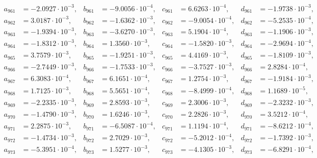 \begin{align*}
  a_{ 961 } &= -2.0927 \cdot 10^{ -3 }, & b_{ 961 } &= -9.0056 \cdot 10^{ -4 }, & c_{ 961 } &= 6.6263 \cdot 10^{ -4 }, & d_{ 961 } &= -1.9738 \cdot 10^{ -3 }, \\ 
  a_{ 962 } &= 3.0187 \cdot 10^{ -3 }, & b_{ 962 } &= -1.6362 \cdot 10^{ -3 }, & c_{ 962 } &= -9.0054 \cdot 10^{ -4 }, & d_{ 962 } &= -5.2535 \cdot 10^{ -4 }, \\ 
  a_{ 963 } &= -1.9394 \cdot 10^{ -3 }, & b_{ 963 } &= -3.6270 \cdot 10^{ -3 }, & c_{ 963 } &= 5.1904 \cdot 10^{ -4 }, & d_{ 963 } &= -1.1906 \cdot 10^{ -3 }, \\ 
  a_{ 964 } &= -1.8312 \cdot 10^{ -3 }, & b_{ 964 } &= 1.3560 \cdot 10^{ -3 }, & c_{ 964 } &= -1.5820 \cdot 10^{ -3 }, & d_{ 964 } &= -2.9694 \cdot 10^{ -4 }, \\ 
  a_{ 965 } &= 3.7579 \cdot 10^{ -3 }, & b_{ 965 } &= -1.9251 \cdot 10^{ -3 }, & c_{ 965 } &= 4.4169 \cdot 10^{ -3 }, & d_{ 965 } &= -1.8109 \cdot 10^{ -3 }, \\ 
  a_{ 966 } &= -2.7449 \cdot 10^{ -3 }, & b_{ 966 } &= -1.7533 \cdot 10^{ -3 }, & c_{ 966 } &= -3.7527 \cdot 10^{ -3 }, & d_{ 966 } &= 2.8284 \cdot 10^{ -4 }, \\ 
  a_{ 967 } &= 6.3083 \cdot 10^{ -4 }, & b_{ 967 } &= 6.1651 \cdot 10^{ -4 }, & c_{ 967 } &= 1.2754 \cdot 10^{ -3 }, & d_{ 967 } &= -1.9184 \cdot 10^{ -3 }, \\ 
  a_{ 968 } &= 1.7125 \cdot 10^{ -3 }, & b_{ 968 } &= 5.5651 \cdot 10^{ -4 }, & c_{ 968 } &= -8.4999 \cdot 10^{ -4 }, & d_{ 968 } &= 1.1689 \cdot 10^{ -5 }, \\ 
  a_{ 969 } &= -2.2335 \cdot 10^{ -3 }, & b_{ 969 } &= 2.8593 \cdot 10^{ -3 }, & c_{ 969 } &= 2.3006 \cdot 10^{ -3 }, & d_{ 969 } &= -2.3232 \cdot 10^{ -3 }, \\ 
  a_{ 970 } &= -1.4790 \cdot 10^{ -3 }, & b_{ 970 } &= 1.6246 \cdot 10^{ -3 }, & c_{ 970 } &= 2.2826 \cdot 10^{ -3 }, & d_{ 970 } &= 3.5212 \cdot 10^{ -4 }, \\ 
  a_{ 971 } &= 2.2875 \cdot 10^{ -3 }, & b_{ 971 } &= -6.5087 \cdot 10^{ -4 }, & c_{ 971 } &= 1.1194 \cdot 10^{ -4 }, & d_{ 971 } &= -8.6212 \cdot 10^{ -4 }, \\ 
  a_{ 972 } &= -1.4734 \cdot 10^{ -3 }, & b_{ 972 } &= 2.7029 \cdot 10^{ -3 }, & c_{ 972 } &= -5.2012 \cdot 10^{ -4 }, & d_{ 972 } &= -1.7392 \cdot 10^{ -3 }, \\ 
  a_{ 973 } &= -5.3951 \cdot 10^{ -4 }, & b_{ 973 } &= 1.5277 \cdot 10^{ -3 }, & c_{ 973 } &= -4.1305 \cdot 10^{ -3 }, & d_{ 973 } &= -6.8291 \cdot 10^{ -4 }, \\ 

\end{align*}
